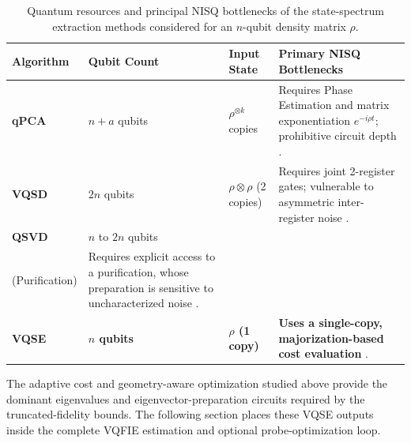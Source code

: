 \begin{table}[H]
    \centering
    \caption{Quantum resources and principal NISQ bottlenecks of the state-spectrum extraction methods considered for an $n$-qubit density matrix $\rho$.}
    \label{tab:vqse_comparison}
    \begin{tabular}{p{2.25cm} p{2.2cm} p{2.6cm} p{5.75cm}}
        \toprule
        \textbf{Algorithm} & \textbf{Qubit Count} & \textbf{Input State}           & \textbf{Primary NISQ Bottlenecks}                                                                               \\
        \midrule
        \textbf{qPCA}      & $n + a$ qubits       & $\rho^{\otimes k}$ copies      & Requires Phase Estimation and matrix exponentiation $e^{-i\rho t}$; prohibitive circuit depth \cite{qpca_2014}. \\
        \textbf{VQSD}      & $2n$ qubits          & $\rho \otimes \rho$ (2 copies) & Requires joint 2-register gates; vulnerable to asymmetric inter-register noise \cite{LaRose2019_vqsd}.          \\
        \textbf{QSVD}      & $n$ to $2n$ qubits   & \makecell{$|\psi_{AB}\rangle$                                                                                                                    \\ (Purification)} & Requires explicit access to a purification, whose preparation is sensitive to uncharacterized noise \cite{Bravo_Prieto_2020_qsvd}. \\
        \textbf{VQSE}      & \textbf{$n$ qubits}  & \textbf{$\rho$ (1 copy)}       & \textbf{Uses a single-copy, majorization-based cost evaluation} \cite{cerezo2022vqse}.                          \\
        \bottomrule
    \end{tabular}
\end{table}

The adaptive cost and geometry-aware optimization studied above provide the dominant eigenvalues and eigenvector-preparation circuits required by the truncated-fidelity bounds. The following section places these VQSE outputs inside the complete VQFIE estimation and optional probe-optimization loop.
